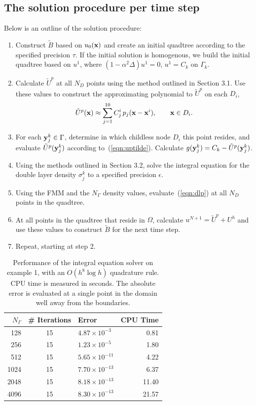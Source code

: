 \documentclass[preprint,12pt]{elsarticle}
\newcommand{\x}{{\bf x}}
\newcommand{\y}{{\bf y}}
\newcommand{\eqr}[1]{~(\ref{#1})}
\begin{document}
\subsection{The solution procedure per time step}
Below is an outline of the solution procedure: 
\begin{enumerate}[STEP 1. ]
\item Construct ${\tilde B}$ based on $u_0(\x)$ and create an initial quadtree according to the specified precision $\tau$.  If the initial solution is homogenous, we build the initial quadtree based on $u^1$, where $(1-\alpha^2 \Delta) u^1 = 0$, $u^1 = C_k$ on $\Gamma_k$.
\item Calculate $\tilde U^p$ at all $N_D$ points using the method outlined in Section 3.1. Use these values to construct 
the approximating polynomial to $\tilde{U}^p$ on each $D_i$, 
\begin{equation}
  \tilde{U}^p(\x) \approx \sum_{j=1}^{10} C^i_j \, p_j (\x-\x^i), \qquad \x \in D_i.  \label{eqn:uptilde}
\end{equation}
\item For each $\y^k_j \in \Gamma$, determine in which childless node $D_i$ this point resides, and evaluate $\tilde{U}^p(\y^k_j )$ according to\eqr{eqn:uptilde}. Calculate $g(\y^k_j) = C_k - \tilde{U}^p(\y^k_j )$. 
\item Using the methods outlined in Section 3.2, solve the integral equation for the double layer density $\sigma_j^k$ to a specified precision $\epsilon$. 
\item Using the FMM and the $N_\Gamma$ density values, evaluate\eqr{eqn:dlp} at all $N_D$ points in the quadtree.
\item At all points in the quadtree that reside in $\Omega$, calculate $u^{N+1} = {\tilde U}^p + U^h$ and use these values to construct $\tilde B$ for the next time step.
\item Repeat, starting at step 2. 
\end{enumerate}

\begin{table}[h]
  \centering
  \begin{tabular*}{\textwidth}{@{\extracolsep{\fill}}rclr}
    \hline
    $N_\Gamma$ & \# Iterations & Error & CPU Time \\
    \hline
    128 & 15 & $4.87 \times 10^{-3}$ & 0.81 \\
    256 & 15 & $1.23 \times 10^{-5}$ & 1.80 \\
    512 & 15 & $5.65 \times 10^{-11}$ & 4.22 \\
    1024 & 15 & $7.70 \times 10^{-13}$ & 6.37 \\
    2048 & 15 & $8.18 \times 10^{-13}$ & 11.40 \\
    4096 & 15 & $8.30 \times 10^{-13}$ & 21.57 \\
    \hline
  \end{tabular*}
\caption{Performance of the integral equation solver on example 1, with an $O(h^8\log h)$ quadrature rule. CPU time is measured in seconds. The absolute error is evaluated at a single point in the domain well away from the boundaries.
\label{table1} }
\end{table}
\end{document}
